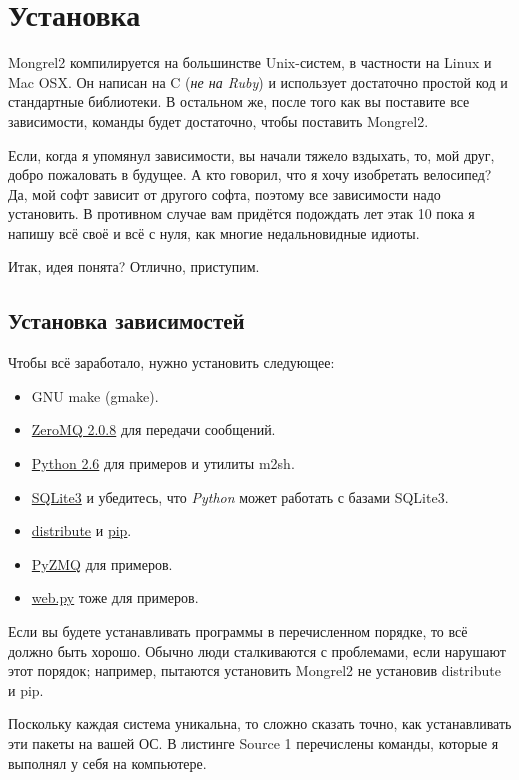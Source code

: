 \chapter{Установка}

Mongrel2 компилируется на большинстве Unix-систем, в частности на Linux и Mac OSX.
Он написан на C (\emph{не на Ruby}) и использует достаточно простой код и стандартные
библиотеки. В остальном же, после того как вы поставите все зависимости,
команды  будет достаточно, чтобы поставить Mongrel2.

Если, когда я упомянул зависимости, вы начали тяжело вздыхать, то, мой друг,
добро пожаловать в будущее. А кто говорил, что я хочу изобретать велосипед?
Да, мой софт зависит от другого софта, поэтому все зависимости надо установить.
В противном случае вам придётся подождать лет этак 10 пока я напишу всё своё
и всё с нуля, как многие недальновидные идиоты.

Итак, идея понята? Отлично, приступим.

\section{Установка зависимостей}

Чтобы всё заработало, нужно установить следующее:

\begin{itemize}
\item GNU make (gmake).
\item \href{http://zeromq.org}{ZeroMQ 2.0.8} для передачи сообщений.
\item \href{http://python.org}{Python 2.6} для примеров и утилиты m2sh.
\item \href{http://www.sqlite.org/}{SQLite3} и убедитесь, что \emph{Python} может работать с базами SQLite3.
\item \href{http://pypi.python.org/pypi/distribute}{distribute} и \href{http://pypi.python.org/pypi/pip/0.7.2}{pip}.
\item \href{http://github.com/zeromq/pyzmq}{PyZMQ} для примеров.
\item \href{http://webpy.org/}{web.py} тоже для примеров.
\end{itemize}

Если вы будете устанавливать программы в перечисленном порядке, то всё должно быть хорошо.
Обычно люди сталкиваются с проблемами, если нарушают этот порядок; например,
пытаются установить Mongrel2 не установив distribute и pip.

Поскольку каждая система уникальна, то сложно сказать точно, как устанавливать
эти пакеты на вашей ОС. В листинге Source 1 перечислены команды, которые я
выполнял у себя на компьютере.


